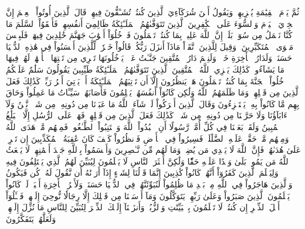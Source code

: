 ثُمَّ يَوۡمَ ٱلۡقِيَٰمَةِ يُخۡزِيهِمۡ وَيَقُولُ أَيۡنَ شُرَكَآءِيَ ٱلَّذِينَ كُنتُمۡ تُشَـٰٓقُّونَ فِيهِمۡۚ قَالَ ٱلَّذِينَ أُوتُواْ ٱلۡعِلۡمَ إِنَّ ٱلۡخِزۡيَ ٱلۡيَوۡمَ وَٱلسُّوٓءَ عَلَى ٱلۡكَٰفِرِينَ
ٱلَّذِينَ تَتَوَفَّىٰهُمُ ٱلۡمَلَـٰٓئِكَةُ ظَالِمِيٓ أَنفُسِهِمۡۖ فَأَلۡقَوُاْ ٱلسَّلَمَ مَا كُنَّا نَعۡمَلُ مِن سُوٓءِۭۚ بَلَىٰٓۚ إِنَّ ٱللَّهَ عَلِيمُۢ بِمَا كُنتُمۡ تَعۡمَلُونَ
فَٱدۡخُلُوٓاْ أَبۡوَٰبَ جَهَنَّمَ خَٰلِدِينَ فِيهَاۖ فَلَبِئۡسَ مَثۡوَى ٱلۡمُتَكَبِّرِينَ
۞وَقِيلَ لِلَّذِينَ ٱتَّقَوۡاْ مَاذَآ أَنزَلَ رَبُّكُمۡۚ قَالُواْ خَيۡرٗاۗ لِّلَّذِينَ أَحۡسَنُواْ فِي هَٰذِهِ ٱلدُّنۡيَا حَسَنَةٞۚ وَلَدَارُ ٱلۡأٓخِرَةِ خَيۡرٞۚ وَلَنِعۡمَ دَارُ ٱلۡمُتَّقِينَ
جَنَّـٰتُ عَدۡنٖ يَدۡخُلُونَهَا تَجۡرِي مِن تَحۡتِهَا ٱلۡأَنۡهَٰرُۖ لَهُمۡ فِيهَا مَا يَشَآءُونَۚ كَذَٰلِكَ يَجۡزِي ٱللَّهُ ٱلۡمُتَّقِينَ
ٱلَّذِينَ تَتَوَفَّىٰهُمُ ٱلۡمَلَـٰٓئِكَةُ طَيِّبِينَ يَقُولُونَ سَلَٰمٌ عَلَيۡكُمُ ٱدۡخُلُواْ ٱلۡجَنَّةَ بِمَا كُنتُمۡ تَعۡمَلُونَ
هَلۡ يَنظُرُونَ إِلَّآ أَن تَأۡتِيَهُمُ ٱلۡمَلَـٰٓئِكَةُ أَوۡ يَأۡتِيَ أَمۡرُ رَبِّكَۚ كَذَٰلِكَ فَعَلَ ٱلَّذِينَ مِن قَبۡلِهِمۡۚ وَمَا ظَلَمَهُمُ ٱللَّهُ وَلَٰكِن كَانُوٓاْ أَنفُسَهُمۡ يَظۡلِمُونَ
فَأَصَابَهُمۡ سَيِّـَٔاتُ مَا عَمِلُواْ وَحَاقَ بِهِم مَّا كَانُواْ بِهِۦ يَسۡتَهۡزِءُونَ
وَقَالَ ٱلَّذِينَ أَشۡرَكُواْ لَوۡ شَآءَ ٱللَّهُ مَا عَبَدۡنَا مِن دُونِهِۦ مِن شَيۡءٖ نَّحۡنُ وَلَآ ءَابَآؤُنَا وَلَا حَرَّمۡنَا مِن دُونِهِۦ مِن شَيۡءٖۚ كَذَٰلِكَ فَعَلَ ٱلَّذِينَ مِن قَبۡلِهِمۡۚ فَهَلۡ عَلَى ٱلرُّسُلِ إِلَّا ٱلۡبَلَٰغُ ٱلۡمُبِينُ
وَلَقَدۡ بَعَثۡنَا فِي كُلِّ أُمَّةٖ رَّسُولًا أَنِ ٱعۡبُدُواْ ٱللَّهَ وَٱجۡتَنِبُواْ ٱلطَّـٰغُوتَۖ فَمِنۡهُم مَّنۡ هَدَى ٱللَّهُ وَمِنۡهُم مَّنۡ حَقَّتۡ عَلَيۡهِ ٱلضَّلَٰلَةُۚ فَسِيرُواْ فِي ٱلۡأَرۡضِ فَٱنظُرُواْ كَيۡفَ كَانَ عَٰقِبَةُ ٱلۡمُكَذِّبِينَ
إِن تَحۡرِصۡ عَلَىٰ هُدَىٰهُمۡ فَإِنَّ ٱللَّهَ لَا يَهۡدِي مَن يُضِلُّۖ وَمَا لَهُم مِّن نَّـٰصِرِينَ
وَأَقۡسَمُواْ بِٱللَّهِ جَهۡدَ أَيۡمَٰنِهِمۡ لَا يَبۡعَثُ ٱللَّهُ مَن يَمُوتُۚ بَلَىٰ وَعۡدًا عَلَيۡهِ حَقّٗا وَلَٰكِنَّ أَكۡثَرَ ٱلنَّاسِ لَا يَعۡلَمُونَ
لِيُبَيِّنَ لَهُمُ ٱلَّذِي يَخۡتَلِفُونَ فِيهِ وَلِيَعۡلَمَ ٱلَّذِينَ كَفَرُوٓاْ أَنَّهُمۡ كَانُواْ كَٰذِبِينَ
إِنَّمَا قَوۡلُنَا لِشَيۡءٍ إِذَآ أَرَدۡنَٰهُ أَن نَّقُولَ لَهُۥ كُن فَيَكُونُ
وَٱلَّذِينَ هَاجَرُواْ فِي ٱللَّهِ مِنۢ بَعۡدِ مَا ظُلِمُواْ لَنُبَوِّئَنَّهُمۡ فِي ٱلدُّنۡيَا حَسَنَةٗۖ وَلَأَجۡرُ ٱلۡأٓخِرَةِ أَكۡبَرُۚ لَوۡ كَانُواْ يَعۡلَمُونَ
ٱلَّذِينَ صَبَرُواْ وَعَلَىٰ رَبِّهِمۡ يَتَوَكَّلُونَ
وَمَآ أَرۡسَلۡنَا مِن قَبۡلِكَ إِلَّا رِجَالٗا نُّوحِيٓ إِلَيۡهِمۡۖ فَسۡـَٔلُوٓاْ أَهۡلَ ٱلذِّكۡرِ إِن كُنتُمۡ لَا تَعۡلَمُونَ
بِٱلۡبَيِّنَٰتِ وَٱلزُّبُرِۗ وَأَنزَلۡنَآ إِلَيۡكَ ٱلذِّكۡرَ لِتُبَيِّنَ لِلنَّاسِ مَا نُزِّلَ إِلَيۡهِمۡ وَلَعَلَّهُمۡ يَتَفَكَّرُونَ
